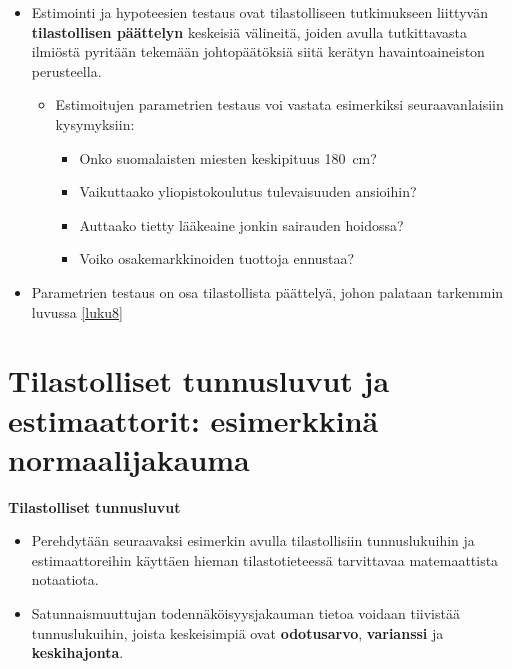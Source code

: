 \documentclass[
]{book}
\providecommand{\tightlist}{%
  \setlength{\itemsep}{0pt}\setlength{\parskip}{0pt}}
\begin{document}
\begin{itemize}
\tightlist
\item
  Estimointi ja hypoteesien testaus ovat tilastolliseen tutkimukseen liittyvän \textbf{tilastollisen päättelyn} keskeisiä välineitä, joiden avulla tutkittavasta ilmiöstä pyritään tekemään johtopäätöksiä siitä kerätyn havaintoaineiston perusteella.

  \begin{itemize}
  \tightlist
  \item
    Estimoitujen parametrien testaus voi vastata esimerkiksi seuraavanlaisiin kysymyksiin:

    \begin{itemize}
    \tightlist
    \item
      Onko suomalaisten miesten keskipituus 180~cm?
    \item
      Vaikuttaako yliopistokoulutus tulevaisuuden ansioihin?
    \item
      Auttaako tietty lääkeaine jonkin sairauden hoidossa?
    \item
      Voiko osakemarkkinoiden tuottoja ennustaa?
    \end{itemize}
  \end{itemize}
\item
  Parametrien testaus on osa tilastollista päättelyä, johon palataan tarkemmin luvussa \ref{luku8}
\end{itemize}

\hypertarget{alaluku43}{%
\section{Tilastolliset tunnusluvut ja estimaattorit: esimerkkinä normaalijakauma}\label{alaluku43}}

\textbf{Tilastolliset tunnusluvut}

\begin{itemize}
\tightlist
\item
  Perehdytään seuraavaksi esimerkin avulla tilastollisiin tunnuslukuihin ja estimaattoreihin käyttäen hieman tilastotieteessä tarvittavaa matemaattista notaatiota.\\
\item
  Satunnaismuuttujan todennäköisyysjakauman tietoa voidaan tiivistää tunnuslukuihin, joista keskeisimpiä ovat \textbf{odotusarvo}, \textbf{varianssi} ja \textbf{keskihajonta}.
\end{itemize}
\end{document}
